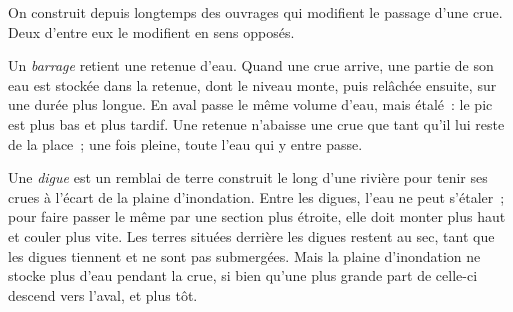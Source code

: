 On construit depuis longtemps des ouvrages qui modifient le passage d'une
crue. Deux d'entre eux le modifient en sens opposés.

Un \emph{barrage} retient une retenue d'eau. Quand une crue arrive, une
partie de son eau est stockée dans la retenue, dont le niveau monte, puis
relâchée ensuite, sur une durée plus longue. En aval passe le même volume
d'eau, mais étalé~: le pic est plus bas et plus tardif. Une retenue n'abaisse
une crue que tant qu'il lui reste de la place~; une fois pleine, toute l'eau
qui y entre passe.

Une \emph{digue} est un remblai de terre construit le long d'une rivière
pour tenir ses crues à l'écart de la plaine d'inondation. Entre les digues,
l'eau ne peut s'étaler~; pour faire passer le même  par une section
plus étroite, elle doit monter plus haut et couler plus vite. Les terres
situées derrière les digues restent au sec, tant que les digues tiennent et
ne sont pas submergées. Mais la plaine d'inondation ne stocke plus d'eau
pendant la crue, si bien qu'une plus grande part de celle-ci descend vers
l'aval, et plus tôt.

